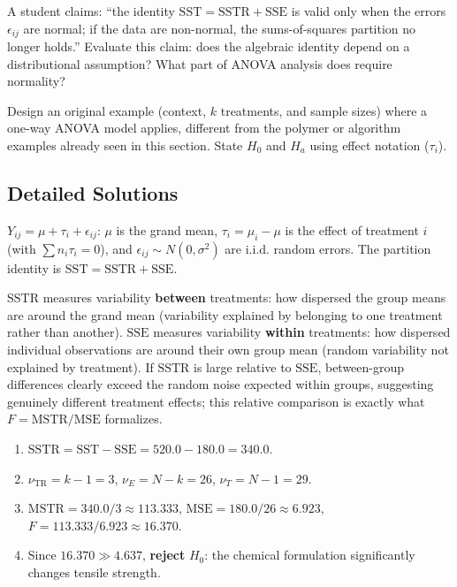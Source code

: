 \begin{problema}
\label{prob:792b2ff}
A student claims: ``the identity $\text{SST}=\text{SSTR}+\text{SSE}$ is valid only when the errors $\epsilon_{ij}$ are normal; if the data are non-normal, the sums-of-squares partition no longer holds.'' Evaluate this claim: does the algebraic identity depend on a distributional assumption? What part of ANOVA analysis does require normality?
\end{problema}

\begin{problema}
\label{prob:4e06b95}
Design an original example (context, $k$ treatments, and sample sizes) where a one-way ANOVA model applies, different from the polymer or algorithm examples already seen in this section. State $H_0$ and $H_a$ using effect notation ($\tau_i$).
\end{problema}

\subsection*{Detailed Solutions}

\begin{solproblema}[prob:04f6e1c]
$Y_{ij}=\mu+\tau_i+\epsilon_{ij}$: $\mu$ is the grand mean, $\tau_i=\mu_i-\mu$ is the effect of treatment $i$ (with $\sum n_i\tau_i=0$), and $\epsilon_{ij}\sim N(0,\sigma^2)$ are i.i.d. random errors. The partition identity is $\text{SST}=\text{SSTR}+\text{SSE}$.
\end{solproblema}

\begin{solproblema}
$\text{SSTR}$ measures variability \textbf{between} treatments: how dispersed the group means are around the grand mean (variability explained by belonging to one treatment rather than another). $\text{SSE}$ measures variability \textbf{within} treatments: how dispersed individual observations are around their own group mean (random variability not explained by treatment). If $\text{SSTR}$ is large relative to $\text{SSE}$, between-group differences clearly exceed the random noise expected within groups, suggesting genuinely different treatment effects; this relative comparison is exactly what $F=\text{MSTR}/\text{MSE}$ formalizes.
\end{solproblema}

\begin{solproblema}[prob:2b1379c]
\begin{enumerate}
\item $\text{SSTR}=\text{SST}-\text{SSE}=520.0-180.0=340.0$.
\item $\nu_{\text{TR}}=k-1=3$, $\nu_E=N-k=26$, $\nu_T=N-1=29$.
\item $\text{MSTR}=340.0/3\approx113.333$, $\text{MSE}=180.0/26\approx6.923$, $F=113.333/6.923\approx16.370$.
\item Since $16.370\gg4.637$, \textbf{reject} $H_0$: the chemical formulation significantly changes tensile strength.
\end{enumerate}
\end{solproblema}

